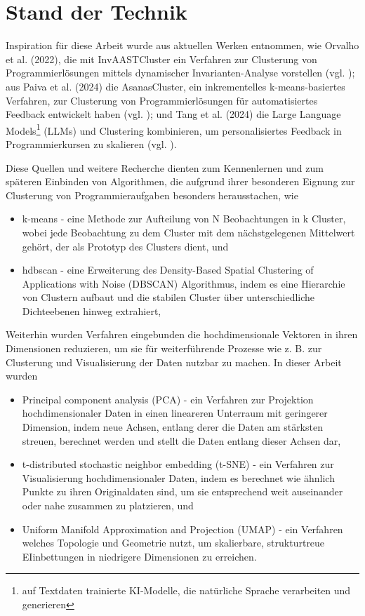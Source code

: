 \section{Stand der Technik}
Inspiration für diese Arbeit wurde aus aktuellen Werken entnommen, wie Orvalho et al. (2022), die mit InvAASTCluster ein Verfahren zur Clusterung von Programmierlösungen mittels dynamischer Invarianten-Analyse vorstellen (vgl. \cite{Orvalho.28.06.2022}); aus Paiva et al. (2024) die AsanasCluster, ein inkrementelles k-means-basiertes Verfahren, zur Clusterung von Programmierlösungen für automatisiertes Feedback entwickelt haben (vgl. \cite{Paiva.2024}); und Tang et al. (2024) die Large Language Models\footnote{auf Textdaten trainierte KI-Modelle, die natürliche Sprache verarbeiten und generieren} (LLMs) und Clustering kombinieren, um personalisiertes Feedback in Programmierkursen zu skalieren (vgl. \cite{Tang.21.10.2024}).

Diese Quellen und weitere Recherche dienten zum Kennenlernen und zum späteren Einbinden von Algorithmen, die aufgrund ihrer besonderen Eignung zur Clusterung von Programmieraufgaben besonders herausstachen, wie 
\begin{itemize}
    \item k-means - eine Methode zur Aufteilung von N Beobachtungen in k Cluster, wobei jede Beobachtung zu dem Cluster mit dem nächstgelegenen Mittelwert gehört, der als Prototyp des Clusters dient, und
    \item hdbscan - eine Erweiterung des Density-Based Spatial Clustering of Applications with Noise (DBSCAN) Algorithmus, indem es eine Hierarchie von Clustern aufbaut und die stabilen Cluster über unterschiedliche Dichteebenen hinweg extrahiert,
\end{itemize}
Weiterhin wurden Verfahren eingebunden die hochdimensionale Vektoren in ihren Dimensionen reduzieren, um sie für weiterführende Prozesse wie z. B. zur Clusterung und Visualisierung der Daten nutzbar zu machen. In dieser Arbeit wurden
\begin{itemize}
    \item Principal component analysis (PCA) - ein Verfahren zur Projektion hochdimensionaler Daten in einen lineareren Unterraum mit geringerer Dimension, indem neue Achsen, entlang derer die Daten am stärksten streuen, berechnet werden und stellt die Daten entlang dieser Achsen dar,
    \item t-distributed stochastic neighbor embedding (t-SNE) - ein Verfahren zur Visualisierung hochdimensionaler Daten, indem es berechnet wie ähnlich Punkte zu ihren Originaldaten sind, um sie entsprechend weit auseinander oder nahe zusammen zu platzieren, und
    \item Uniform Manifold Approximation and Projection (UMAP) - ein Verfahren welches Topologie und Geometrie nutzt, um skalierbare, strukturtreue EIinbettungen in niedrigere Dimensionen zu erreichen.
\end{itemize}


